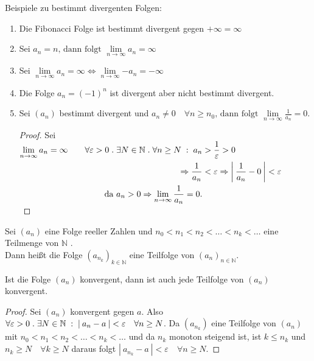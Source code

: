 \documentclass[a4paper,titlepage,oneside]{article}
\def\N{\ensuremath{\mathbb{N}} }
\renewcommand{\epsilon}{\ensuremath{\varepsilon} }
\def\sp{\hspace{0,1cm}}
\def\spdot{\sp.\sp}
\def\spcolon{\sp:\sp}
\renewcommand{\liminf}[2][n]{\ensuremath{\lim\limits_{#1 \rightarrow \infty}{#2}}}
\newcommand{\abs}[1]{\ensuremath{\left|\:#1\:\right|}}
\theoremstyle{thmstyle}
\begin{document}
\begin{subbsp}
Beispiele zu bestimmt divergenten Folgen:
\begin{enumerate}
\item Die Fibonacci Folge ist bestimmt divergent gegen \(+ \infty = \infty \)
\item Sei \(a_n = n\text{, dann folgt }\liminf{a_n} = \infty\)
\item Sei \(\liminf{a_n} = \infty \Leftrightarrow \liminf{-a_n} = - \infty\)
\item Die Folge \(a_n = (-1)^n\) ist divergent aber nicht bestimmt divergent.
\item Sei \((a_n)\) bestimmt divergent und $ \displaystyle a_n \ne 0 \quad \forall n \ge n_0\text{, dann folgt }\liminf{\frac{1}{a_n}} = 0$.
\begin{proof}Sei $ \displaystyle \liminf{a_n} = \infty \quad
\begin{aligned}[t] &&\forall \epsilon > 0 \spdot \exists N \in \N \spdot \forall n \ge N \spcolon a_n &> \frac{1}{\epsilon} > 0 \\
&&\Rightarrow \frac{1}{a_n} &< \epsilon \Rightarrow \abs{\frac{1}{a_n} - 0} < \epsilon  \\
&&\text{da } a_n > 0 \Rightarrow \liminf{\frac{1}{a_n}} = 0.
\end{aligned}$\\
\end{proof}
\end{enumerate}
\end{subbsp}

\begin{subdefi}
Sei \((a_n)\) eine Folge reeller Zahlen und \(n_0 < n_1 < n_2 < \dots < n_k < \dots \) eine Teilmenge von \N.\\
Dann heißt die Folge \((a_{n_k})_{k \in \N }\) eine Teilfolge von \((a_n)_{n \in \N}\).
\end{subdefi}

\begin{subbem}
Ist die Folge \((a_n)\) konvergent, dann ist auch jede Teilfolge von \((a_n)\) konvergent.
\begin{proof} Sei $(a_n)$ konvergent gegen $a$. Also $ \forall \epsilon > 0 \spdot \exists N \in \N \spcolon \abs{a_n - a} < \epsilon \quad \forall n \ge N$. Da $(a_{n_k})$ eine Teilfolge von $(a_n)$ mit $n_0 < n_1 < n_2 < \dots < n_k < \dots$ und da $n_k$ monoton steigend ist, ist $k \le n_k$ und $n_k \ge N \quad \forall k \ge N $ daraus folgt $\abs{a_{n_k} - a} < \epsilon \quad \forall n \ge N$.
\end{proof}
\end{subbem}
\end{document}
